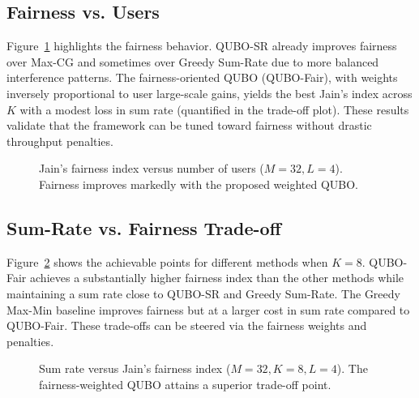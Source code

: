 {\subsection{Fairness vs. Users}
Figure~\ref{fig:fairness} highlights the fairness behavior. QUBO-SR already improves fairness over Max-CG and sometimes over Greedy Sum-Rate due to more balanced interference patterns. The fairness-oriented QUBO (QUBO-Fair), with weights inversely proportional to user large-scale gains, yields the best Jain’s index across $K$ with a modest loss in sum rate (quantified in the trade-off plot). These results validate that the framework can be tuned toward fairness without drastic throughput penalties.

\begin{figure}[htbp]
\centering
{}
\caption{Jain’s fairness index versus number of users ($M=32, L=4$). Fairness improves markedly with the proposed weighted QUBO.}
\label{fig:fairness}
\end{figure}

\subsection{Sum-Rate vs. Fairness Trade-off}
Figure~\ref{fig:tradeoff} shows the achievable points for different methods when $K=8$. QUBO-Fair achieves a substantially higher fairness index than the other methods while maintaining a sum rate close to QUBO-SR and Greedy Sum-Rate. The Greedy Max-Min baseline improves fairness but at a larger cost in sum rate compared to QUBO-Fair. These trade-offs can be steered via the fairness weights and penalties.

\begin{figure}[htbp]
\centering
{}
\caption{Sum rate versus Jain’s fairness index ($M=32, K=8, L=4$). The fairness-weighted QUBO attains a superior trade-off point.}
\label{fig:tradeoff}
\end{figure}

}
